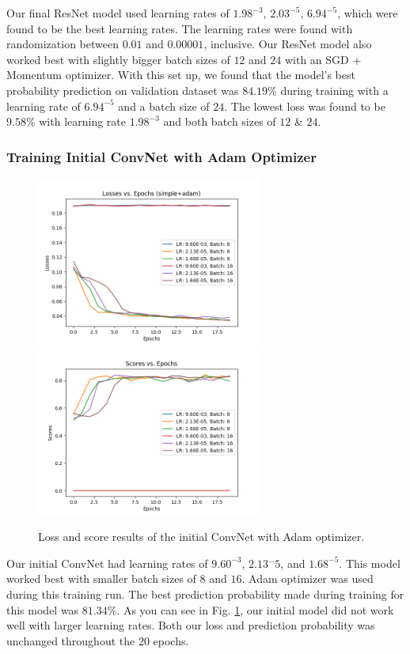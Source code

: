 \documentclass[11pt]{ieeeconf}
\begin{document}
Our final ResNet model  used learning rates of $1.98^{-3}$, $2.03^{-5}$, $6.94^{-5}$, which were found to be the best learning rates. The learning rates were found with randomization between $0.01$ and $0.00001$, inclusive. Our ResNet model also worked best with slightly bigger batch sizes of $12$ and $24$ with an SGD + Momentum optimizer.
With this set up, we found that the model’s best probability prediction on validation dataset was $84.19\%$ during training with a learning rate of $6.94^{-5}$ and a batch size of $24$. The lowest loss was found to be $9.58\%$ with learning rate $1.98^{-3}$ and both batch sizes of $12$ \& $24$.

\subsubsection{Training Initial ConvNet with Adam Optimizer}
\begin{figure}[h]
  \centering
  \includegraphics[width=20em]{simple_adam_Losses_20e.png}
  \includegraphics[width=20em]{simple_adam_Scores_20e.png}
  \caption{Loss and score results of the initial ConvNet with Adam optimizer.}
  \label{fig:simple_adam}
\end{figure}

Our initial ConvNet had learning rates of $9.60^{-3}$, $2.13{^-5}$, and $1.68^{-5}$.  This model worked best with smaller batch sizes of $8$ and $16$. Adam optimizer was used during this training run. The best prediction probability made during training for this model was $81.34\%$. As you can see in Fig. \ref{fig:simple_adam}, our initial model did not work well with larger learning rates. Both our loss and prediction probability was unchanged throughout the $20$ epochs.
\end{document}

